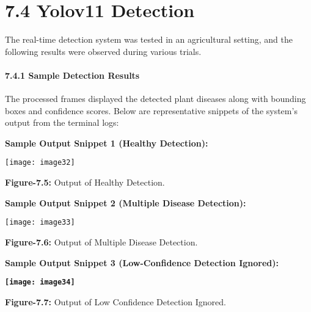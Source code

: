 \documentclass{book} %
\begin{document}
\noindent 

\noindent 
\section{}

\noindent 
\section{}

\noindent 
\section{}

\noindent 
\section{7.4 Yolov11 Detection}

\noindent The real-time detection system was tested in an agricultural setting, and the following results were observed during various trials.

\noindent 
\paragraph{7.4.1 Sample Detection Results}

\noindent The processed frames displayed the detected plant diseases along with bounding boxes and confidence scores. Below are representative snippets of the system's output from the terminal logs:

\noindent \textbf{Sample Output Snippet 1 (Healthy Detection):}

\noindent \texttt{[image: image32]}

\textbf{Figure-7.5: }Output of  Healthy Detection.

\noindent \textbf{Sample Output Snippet 2 (Multiple Disease Detection):}

\noindent \texttt{[image: image33]} 

\noindent \textbf{Figure-7.6: }Output of  Multiple Disease Detection.

\noindent \textbf{Sample Output Snippet 3 (Low-Confidence Detection Ignored):}

\noindent \textbf{\texttt{[image: image34]}}

\textbf{Figure-7.7: }Output of  Low Confidence  Detection Ignored.
\end{document}
